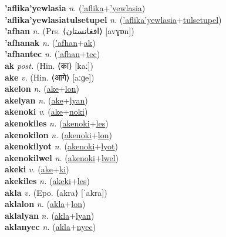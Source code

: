\textbf{'aflika'yewlasia} \textit{n.} (\hyperref['aflika]{'aflika}+\hyperref['yewlasia]{'yewlasia})
 \label{'aflika'yewlasia} \\
\textbf{'aflika'yewlasiatulsetupel} \textit{n.} (\hyperref['aflika'yewlasia]{'aflika'yewlasia}+\hyperref[tulsetupel]{tulsetupel})
 \label{'aflika'yewlasiatulsetupel} \\
\textbf{'afhan} \textit{n.} (Prs. ⟨افغانستان‬⟩ [avɣɒn])
 \label{'afhan} \\
\textbf{'afhanak} \textit{n.} (\hyperref['afhan]{'afhan}+\hyperref[ak]{ak})
 \label{'afhanak} \\
\textbf{'afhantec} \textit{n.} (\hyperref['afhan]{'afhan}+\hyperref[tec]{tec})
 \label{'afhantec} \\
\textbf{ak} \textit{post.} (Hin. ⟨का⟩ [kaː])
 \label{ak} \\
\textbf{ake} \textit{v.} (Hin. ⟨आगे⟩ [aːɡe])
 \label{ake} \\
\textbf{akelon} \textit{n.} (\hyperref[ake]{ake}+\hyperref[lon]{lon})
 \label{akelon} \\
\textbf{akelyan} \textit{n.} (\hyperref[ake]{ake}+\hyperref[lyan]{lyan})
 \label{akelyan} \\
\textbf{akenoki} \textit{v.} (\hyperref[ake]{ake}+\hyperref[noki]{noki})
 \label{akenoki} \\
\textbf{akenokiles} \textit{n.} (\hyperref[akenoki]{akenoki}+\hyperref[les]{les})
 \label{akenokiles} \\
\textbf{akenokilon} \textit{n.} (\hyperref[akenoki]{akenoki}+\hyperref[lon]{lon})
 \label{akenokilon} \\
\textbf{akenokilyot} \textit{n.} (\hyperref[akenoki]{akenoki}+\hyperref[lyot]{lyot})
 \label{akenokilyot} \\
\textbf{akenokilwel} \textit{n.} (\hyperref[akenoki]{akenoki}+\hyperref[lwel]{lwel})
 \label{akenokilwel} \\
\textbf{akeki} \textit{v.} (\hyperref[ake]{ake}+\hyperref[ki]{ki})
 \label{akeki} \\
\textbf{akekiles} \textit{n.} (\hyperref[akeki]{akeki}+\hyperref[les]{les})
 \label{akekiles} \\
\textbf{akla} \textit{v.} (Epo. ⟨akra⟩ [ˈakra])
 \label{akla} \\
\textbf{aklalon} \textit{n.} (\hyperref[akla]{akla}+\hyperref[lon]{lon})
 \label{aklalon} \\
\textbf{aklalyan} \textit{n.} (\hyperref[akla]{akla}+\hyperref[lyan]{lyan})
 \label{aklalyan} \\
\textbf{aklanyec} \textit{n.} (\hyperref[akla]{akla}+\hyperref[nyec]{nyec})
